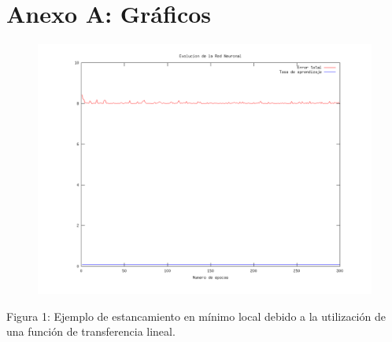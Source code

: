 \documentclass[%
    final,
    reprint,
    notitlepage,
    narroweqnarray,
    inline,
    twoside,
    invited
    ]{ieee}
\begin{document}






\clearpage
\onecolumn

\section*{Anexo A: Gráficos}

\begin{figure}[H]
\begin{center}
\includegraphics[scale=0.30]{./images/LinearConstante.png}
\label{modelado}
\end{center}
\end{figure}

\begin{center}
\par Figura 1: Ejemplo de estancamiento en mínimo local debido a la utilización de una función de transferencia lineal.
\end{center}
\end{document}
